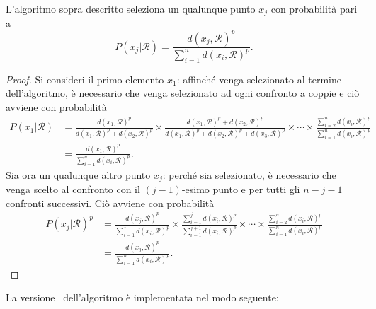 \documentclass[runningheads]{llncs}
\begin{document}
\begin{theorem}
    L'algoritmo sopra descritto seleziona un qualunque punto $x_j$ con probabilità pari a
    \[
        P(x_j |\mathcal{R})= \frac{d(x_j, \mathcal{R})^{p}}{\sum_{i=1}^{n} d(x_i, \mathcal{R})^{p}}.
    \]
\end{theorem}
\begin{proof}
    Si consideri il primo elemento $x_1$: affinché venga selezionato al termine dell'algoritmo, è necessario che venga selezionato ad ogni confronto a coppie e ciò avviene con probabilità
    \[
        \begin{aligned}
            P(x_1|\mathcal{R}) & = \frac{d(x_1, \mathcal{R})^{p}}{d(x_1, \mathcal{R})^{p} + d(x_2, \mathcal{R})^{p}} \times  \frac{d(x_1, \mathcal{R})^{p} + d(x_2, \mathcal{R})^{p}}{d(x_1, \mathcal{R})^{p} + d(x_2, \mathcal{R})^{p} + d(x_3, \mathcal{R})^{p}} \times  \cdots \times   \frac{\sum_{i = 2}^n d(x_i, \mathcal{R})^{p} }{\sum_{i = 1}^n d(x_i, \mathcal{R})^{p}}\\[.1cm]
                               &= \frac{d(x_1, \mathcal{R})^{p}}{\sum_{i=1}^{n} d(x_i, \mathcal{R})^{p}}. 
        \end{aligned}
    \]
    Sia ora un qualunque altro punto $x_j$: perché sia selezionato, è necessario che venga scelto al confronto con il $(j-1)$-esimo punto e per tutti gli $n-j-1$ confronti successivi. Ciò avviene con probabilità
    \[
        \begin{aligned}
            P(x_j|\mathcal{R})^{p} &= \frac{d(x_j, \mathcal{R})^{p}}{\sum_{i=1}^{j} d(x_i, \mathcal{R})^{p}} \times \frac{\sum_{i=1}^{j}d(x_i, \mathcal{R})^{p} }{\sum_{i=1}^{j+1}d(x_i, \mathcal{R})^{p}} \times \cdots \times \frac{\sum_{i = 2}^n d(x_i, \mathcal{R})^{p} }{\sum_{i = 1}^n d(x_i, \mathcal{R})^{p}}\\[.1cm]
            &= \frac{d(x_j, \mathcal{R})^{p}}{\sum_{i=1}^{n} d(x_i, \mathcal{R})^{p}}. 
        \end{aligned}
    \]
\end{proof}
La versione \mr\ dell'algoritmo è implementata nel modo seguente:
\end{document}
